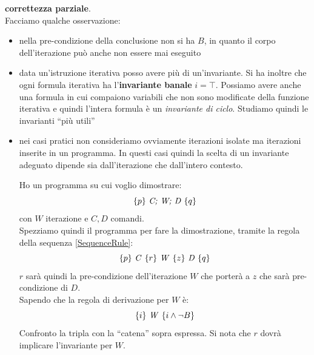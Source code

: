			\textbf{correttezza parziale}.\\
			Facciamo qualche osservazione:
			\begin{itemize}
				\item nella pre-condizione della conclusione non si ha $B$, in quanto il
				      corpo dell'iterazione può anche non essere mai eseguito
				\item data un'istruzione iterativa posso avere più di un'invariante. Si ha
				      inoltre che ogni formula iterativa ha l'\textbf{invariante banale}
				      $i=\top$. Possiamo avere anche una formula in cui compaiono variabili che
				      non sono modificate della funzione iterativa e quindi l'intera formula è un
				      \textit{invariante di ciclo}. Studiamo quindi le invarianti ``più utili''
				\item nei casi pratici non consideriamo ovviamente iterazioni isolate ma
				      iterazioni inserite in un programma. In questi casi quindi la scelta di un
				      invariante adeguato dipende sia dall'iterazione che dall'intero contesto.
				      \begin{esempio}
				      	Ho un programma su cui voglio dimostrare:
				      	\[\{p\}\mbox{ \textit{C; W; D} }\{q\}\]
				      	con $W$ iterazione e $C, D$ comandi.\\
				      	Spezziamo quindi il programma per fare la dimostrazione, tramite la regola
				      	della sequenza \ref{SequenceRule}:
				      	\[\{p\}\mbox{ \textit{C} }\{r\}\mbox{ \textit{W} }\{z\}\mbox{ \textit{D}
				      			}\{q\}\]
				      		$r$ sarà quindi la pre-condizione dell'iterazione $W$ che porterà a $z$ che
				      		sarà pre-condizione di $D$.\\
				      		Sapendo che la regola di derivazione per $W$ è:
				      		\[\{i\}\mbox{ \textit{W} }\{i\land\neg B\}\]
				      		Confronto la tripla con la ``catena'' sopra espressa. Si nota che $r$
				      		dovrà implicare l'invariante per $W$.
				      		\end{esempio}
				      		\end{itemize}
